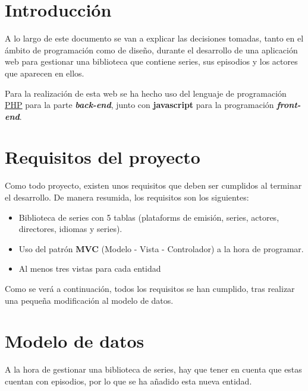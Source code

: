 \documentclass{\ClassPath/viu-tfm-template}
\begin{document}
\graphicspath{{../../VIU_TFM_LaTeX_template/}}

\coverpage

\tableofcontents

\chapter{Introducción}

A lo largo de este documento se van a explicar las decisiones tomadas, tanto en el ámbito de programación como de diseño, durante el desarrollo de una aplicación web para gestionar una biblioteca que contiene series, sus episodios y los actores que aparecen en ellos.

Para la realización de esta web se ha hecho uso del lenguaje de programación \href{https://www.php.net/}{PHP} para la parte \textit{\textbf{back-end}}, junto con \textbf{javascript} para la programación \textbf{\textit{front-end}}.


\chapter{Requisitos del proyecto}

Como todo proyecto, existen unos requisitos que deben ser cumplidos al terminar el desarrollo. De manera resumida, los requisitos son los siguientes:

\vspace{-1em}
\begin{itemize}
    \item Biblioteca de series con 5 tablas (plataforms de emisión, series, actores, directores, idiomas y series).
    \item Uso del patrón \textbf{MVC} (Modelo - Vista - Controlador) a la hora     de programar.
    \item Al menos tres vistas para cada entidad
\end{itemize}
\vspace{-1em}

Como se verá a continuación, todos los requisitos se han cumplido, tras realizar una pequeña modificación al modelo de datos.

\chapter{Modelo de datos}
A la hora de gestionar una biblioteca de series, hay que tener en cuenta que estas cuentan con episodios, por lo que se ha añadido esta nueva entidad.
\end{document}
